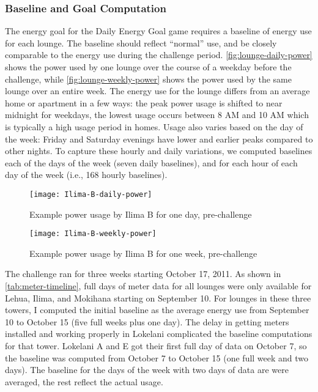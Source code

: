 \subsubsection{Baseline and Goal Computation}
\label{sec:baseline-computation}

The energy goal for the Daily Energy Goal game requires a baseline of energy use for each lounge. The baseline should reflect ``normal'' use, and be closely comparable to the energy use during the challenge period. \autoref{fig:lounge-daily-power} shows the power used by one lounge over the course of a weekday before the challenge, while \autoref{fig:lounge-weekly-power} shows the power used by the same lounge over an entire week. The energy use for the lounge differs from an average home or apartment in a few ways: the peak power usage is shifted to near midnight for weekdays, the lowest usage occurs between 8 AM and 10 AM which is typically a high usage period in homes. Usage also varies based on the day of the week: Friday and Saturday evenings have lower and earlier peaks compared to other nights. To capture these hourly and daily variations, we computed baselines each of the days of the week (seven daily baselines), and for each hour of each day of the week (i.e., 168 hourly baselines).

\begin{figure}[htbp]
	\centering
		\texttt{[image: Ilima-B-daily-power]}
		\caption{Example power usage by Ilima B for one day, pre-challenge}
\label{fig:lounge-daily-power}
\end{figure}

\begin{figure}[htbp]
	\centering
		\texttt{[image: Ilima-B-weekly-power]}
		\caption{Example power usage by Ilima B for one week, pre-challenge}
\label{fig:lounge-weekly-power}
\end{figure}

The challenge ran for three weeks starting October 17, 2011. As shown in \autoref{tab:meter-timeline}, full days of meter data for all lounges were only available for Lehua, Ilima, and Mokihana starting on September 10. For lounges in these three towers, I computed the initial baseline as the average energy use from September 10 to October 15 (five full weeks plus one day). The delay in getting meters installed and working properly in Lokelani complicated the baseline computations for that tower. Lokelani A and E got their first full day of data on October 7, so the baseline was computed from October 7 to October 15 (one full week and two days). The baseline for the days of the week with two days of data are were averaged, the rest reflect the actual usage.

